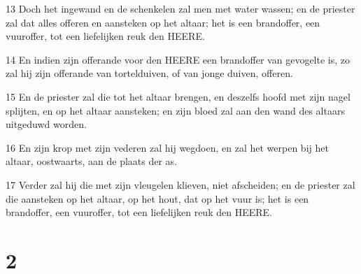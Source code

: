 \par 13 Doch het ingewand en de schenkelen zal men met water wassen; en de priester zal dat alles offeren en aansteken op het altaar; het is een brandoffer, een vuuroffer, tot een liefelijken reuk den HEERE.
\par 14 En indien zijn offerande voor den HEERE een brandoffer van gevogelte is, zo zal hij zijn offerande van tortelduiven, of van jonge duiven, offeren.
\par 15 En de priester zal die tot het altaar brengen, en deszelfs hoofd met zijn nagel splijten, en op het altaar aansteken; en zijn bloed zal aan den wand des altaars uitgeduwd worden.
\par 16 En zijn krop met zijn vederen zal hij wegdoen, en zal het werpen bij het altaar, oostwaarts, aan de plaats der as.
\par 17 Verder zal hij die met zijn vleugelen klieven, niet afscheiden; en de priester zal die aansteken op het altaar, op het hout, dat op het vuur is; het is een brandoffer, een vuuroffer, tot een liefelijken reuk den HEERE.

\chapter{2}

